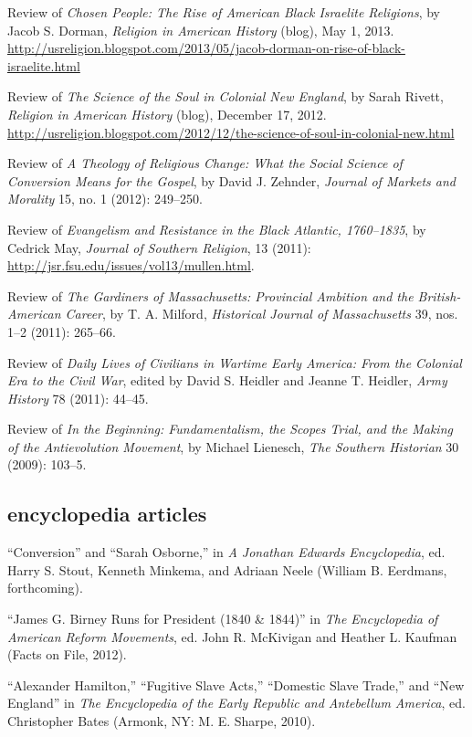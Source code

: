 \documentclass[11pt]{article}
\begin{document}
Review of \emph{Chosen People: The Rise of American Black Israelite 
Religions}, by Jacob S. Dorman, \emph{Religion in American History} (blog), 
May 1, 2013.  
\href{http://usreligion.blogspot.com/2013/05/jacob-dorman-on-rise-of-black-israelite.html}{http://usreligion.blogspot.com/2013/05/jacob-dorman-on-rise-of-black-israelite.html} 

Review of \emph{The Science of the Soul in Colonial New England}, by Sarah 
Rivett, \emph{Religion in American History} (blog), December 17, 2012. 
\href{http://usreligion.blogspot.com/2012/12/the-science-of-soul-in-colonial-new.html}{http://usreligion.blogspot.com/2012/12/the-science-of-soul-in-colonial-new.html}

Review of \emph{A Theology of Religious Change: What the Social Science
of Conversion Means for the Gospel}, by David J. Zehnder, \emph{Journal
of Markets and Morality} 15, no. 1 (2012): 249--250.

Review of \emph{Evangelism and Resistance in the Black Atlantic,
1760--1835}, by Cedrick May, \emph{Journal of Southern Religion}, 13
(2011): \url{http://jsr.fsu.edu/issues/vol13/mullen.html}.

Review of \emph{The Gardiners of Massachusetts: Provincial Ambition and
the British-American Career}, by T. A. Milford, \emph{Historical Journal of
Massachusetts} 39, nos. 1--2 (2011): 265--66.

Review of \emph{Daily Lives of Civilians in Wartime Early America: From
the Colonial Era to the Civil War}, edited by David S. Heidler and
Jeanne T. Heidler, \emph{Army History} 78 (2011): 44--45.

Review of \emph{In the Beginning: Fundamentalism, the Scopes Trial, and
the Making of the Antievolution Movement}, by Michael Lienesch,
\emph{The Southern Historian} 30 (2009): 103--5.

\subsection{encyclopedia articles}

``Conversion'' and ``Sarah Osborne,'' in \emph{A Jonathan Edwards 
Encyclopedia}, ed. Harry S. Stout, Kenneth Minkema, and Adriaan Neele (William 
B. Eerdmans, forthcoming).

``James G. Birney Runs for President (1840 \& 1844)'' in \emph{The
Encyclopedia of American Reform Movements}, ed. John R. McKivigan and
Heather L. Kaufman (Facts on File, 2012).

``Alexander Hamilton,'' ``Fugitive Slave Acts,'' ``Domestic Slave
Trade,'' and ``New England'' in \emph{The Encyclopedia of the Early
Republic and Antebellum America}, ed. Christopher Bates (Armonk, NY: M.
E. Sharpe, 2010).
\end{document}
